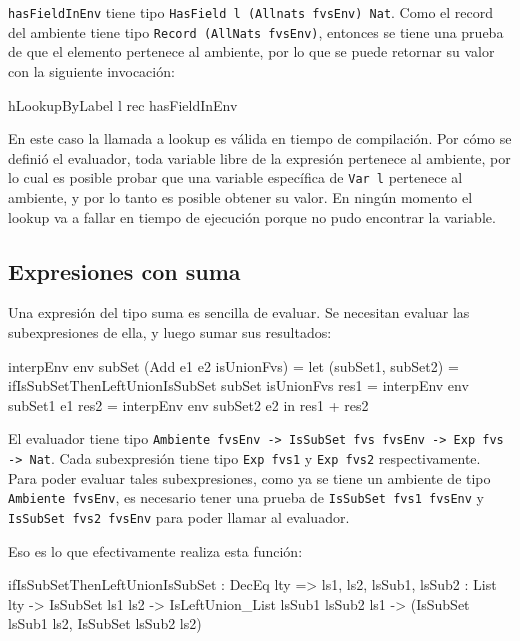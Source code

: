 \texttt{hasFieldInEnv} tiene tipo \texttt{HasField l (Allnats fvsEnv) Nat}. Como el record del ambiente tiene tipo \texttt{Record (AllNats fvsEnv)}, entonces se tiene una prueba de que el elemento pertenece al ambiente, por lo que se puede retornar su valor con la siguiente invocación:

\begin{code}
hLookupByLabel l rec hasFieldInEnv
\end{code}

En este caso la llamada a lookup es válida en tiempo de compilación. Por cómo se definió el evaluador, toda variable libre de la expresión pertenece al ambiente, por lo cual es posible probar que una variable específica de \texttt{Var l} pertenece al ambiente, y por lo tanto es posible obtener su valor. En ningún momento el lookup va a fallar en tiempo de ejecución porque no pudo encontrar la variable.

\subsection{Expresiones con suma}

Una expresión del tipo suma es sencilla de evaluar. Se necesitan evaluar las subexpresiones de ella, y luego sumar sus resultados:

\begin{code}
interpEnv env subSet (Add e1 e2 isUnionFvs) =
  let (subSet1, subSet2) =
      ifIsSubSetThenLeftUnionIsSubSet subSet isUnionFvs
    res1 = interpEnv env subSet1 e1
    res2 = interpEnv env subSet2 e2
  in res1 + res2
\end{code}

El evaluador tiene tipo \texttt{Ambiente fvsEnv -> IsSubSet fvs fvsEnv -> Exp fvs -> Nat}. Cada subexpresión tiene tipo \texttt{Exp fvs1} y \texttt{Exp fvs2} respectivamente. Para poder evaluar tales subexpresiones, como ya se tiene un ambiente de tipo \texttt{Ambiente fvsEnv}, es necesario tener una prueba de \texttt{IsSubSet fvs1 fvsEnv} y \texttt{IsSubSet fvs2 fvsEnv} para poder llamar al evaluador.

Eso es lo que efectivamente realiza esta función:

\begin{code}
ifIsSubSetThenLeftUnionIsSubSet : DecEq lty =>
  {ls1, ls2, lsSub1, lsSub2 : List lty} -> IsSubSet ls1 ls2 ->
  IsLeftUnion_List lsSub1 lsSub2 ls1 ->
  (IsSubSet lsSub1 ls2, IsSubSet lsSub2 ls2)
\end{code}

